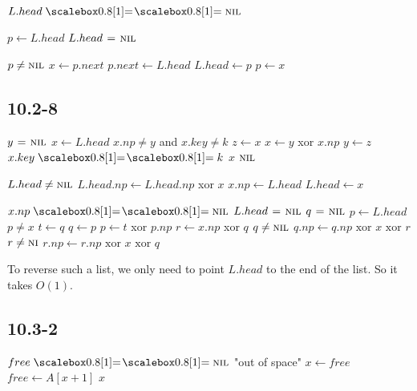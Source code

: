 \documentclass{book}
\begin{document}
\begin{CJK}{UTF8}{gkai}
\begin{codebox}
\li \If $L.head \isequal \const{nil}$
\li \Then \Return
\End

\li $p \gets L.head$
\li $L.head \mathrel{\hspace{1pt}=\hspace{1pt}} \textnormal{\scshape nil}$

\li \While $p \ne \textnormal{\scshape nil}$
\li \Do  $x \gets p.next$
\li $p.next \gets L.head$
\li $L.head \gets p$
\li $p \gets x$
\End
\end{codebox}

\subsection*{10.2-8}

\begin{codebox}
\li $y \mathrel{\hspace{1pt}=\hspace{1pt}} \textnormal{\scshape nil}$
\li $x \gets L.head$
\li \While $x.np \ne y$ and $x.key \ne k$
\li \Do $z \gets x$
\li $x \gets y $ xor $x.np$
\li $y \gets z$
\End
\li \If $x.key \isequal k$
\li \Then \Return $x$
\li \Else \Return $\textnormal{\scshape nil}$
\End
\end{codebox}

\begin{codebox}
\li \If $L.head \ne \textnormal{\scshape nil}$
\li \Then $L.head.np \gets L.head.np$ xor $x$
\li $x.np \gets L.head$
\End
\li $L.head \gets x$
\end{codebox}

\begin{codebox}
\li \If $x.np \isequal \const{nil}$
\li \Then $L.head \mathrel{\hspace{1pt}=\hspace{1pt}} \textnormal{\scshape nil}$
\End
\li $q \mathrel{\hspace{1pt}=\hspace{1pt}} \textnormal{\scshape nil}$
\li $p \gets L.head$
\li \While $p \ne x$
\li \Do $t \gets q$
\li $q \gets p$
\li $p \gets t$ xor $p.np$
\End
\li $r \gets x.np $ xor $q$
\li \If $q \ne \textnormal{\scshape nil}$
\li \Then $q.np \gets q.np \text{ xor } x \text{ xor } r$
\End
\li \If $r \ne \textnormal{\scshape ni}$
\li \Then $r.np \gets r.np \text{ xor } x \text{ xor } q$
\End
\end{codebox}
To reverse such a list, we only need to point $L.head$ to the end of the list.  
So it takes $O(1)$.

\subsection*{10.3-2}

\begin{codebox}

\li \If $free \isequal \const{nil}$
\li \Then \Error "out of space"
\li \Else $x \gets free$
\li $free \gets A[x+1]$
\li \Return $x$
\End
\end{codebox}


\end{CJK}
\end{document}
